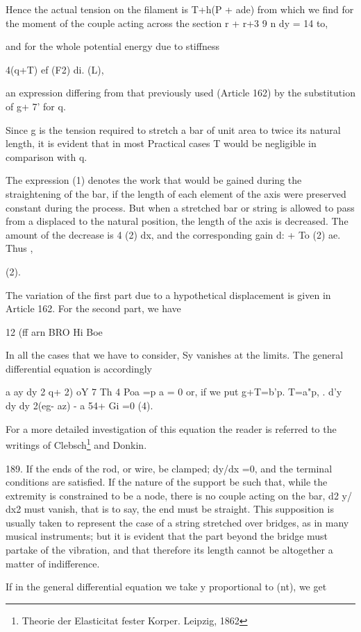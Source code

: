 Hence the actual tension on the filament is T+h(P + ade) from which we
find for the moment of the couple acting across the section r + r+3 9 n
dy = 14 to,

and for the whole potential energy due to stiffness

4(q+T) ef (F2) di. (L),

an expression differing from that previously used (Article 162) by the
substitution of g+ 7' for q.

Since g is the tension required to stretch a bar of unit area to twice
its natural length, it is evident that in most Practical cases T would
be negligible in comparison with q.

The expression (1) denotes the work that would be gained during the
straightening of the bar, if the length of each element of the axis were
preserved constant during the process. But when a stretched bar or
string is allowed to pass from a displaced
to the natural position, the length of the axis is decreased. The
amount of the decrease is 4 (2) dx, and the corresponding gain d: + To
(2) ae. Thus ,

(2).

The variation of the first part due to a hypothetical displacement is
given in Article 162. For the second part, we have

12 (ff arn BRO Hi Boe

In all the cases that we have to consider, Sy vanishes at the limits.
The general differential equation is accordingly

a ay dy 2 q+ 2) oY 7 Th 4 Poa =p a = 0 or, if we put g+T=b'p. T=a"p, .
d'y dy dy 2(eg- az) - a 54+ Gi =0 (4).

For a more detailed investigation of this equation the reader is
referred to the writings of Clebsch\footnote{Theorie der Elasticitat fester
Korper. Leipzig, 1862} and Donkin.

189. If the ends of the rod, or wire, be clamped; dy/dx =0, and the
terminal conditions are satisfied. If the nature of the support be such
that, while the extremity is constrained to be a node, there is no
couple acting on the bar, d2 y/ dx2 must vanish, that is to say, the end
must be straight. This supposition is usually taken to represent the
case of a string stretched over bridges, as in many musical instruments;
but it is evident that the part beyond the bridge must partake of the
vibration, and that therefore its length cannot be altogether a matter
of indifference.

If in the general differential equation we take y proportional to (nt),
we get

